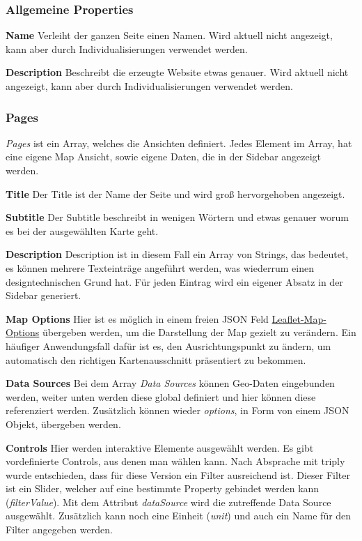 \subsubsection{Allgemeine Properties}
\textbf{Name}
Verleiht der ganzen Seite einen Namen.
Wird aktuell nicht angezeigt, kann aber durch Individualisierungen verwendet werden.

\textbf{Description}
Beschreibt die erzeugte Website etwas genauer.
Wird aktuell nicht angezeigt, kann aber durch Individualisierungen verwendet werden.

\subsubsection{Pages}
\emph{Pages} ist ein Array, welches die Ansichten definiert.
Jedes Element im Array, hat eine eigene Map Ansicht, sowie eigene Daten, die in der Sidebar angezeigt werden.

\textbf{Title}
Der Title ist der Name der Seite und wird groß hervorgehoben angezeigt.

\textbf{Subtitle}
Der Subtitle beschreibt in wenigen Wörtern und etwas genauer worum es bei der ausgewählten Karte geht.

\textbf{Description}
Description ist in diesem Fall ein Array von Strings, das bedeutet, es können mehrere Texteinträge angeführt werden,
was wiederrum einen designtechnischen Grund hat.
Für jeden Eintrag wird ein eigener Absatz in der Sidebar generiert.

\textbf{Map Options}
Hier ist es möglich in einem freien JSON Feld \href{https://leafletjs.com/SlavaUkraini/reference.html#map-option}{Leaflet-Map-Options}
übergeben werden, um die Darstellung der Map gezielt zu verändern.
Ein häufiger Anwendungsfall dafür ist es, den Ausrichtungspunkt zu ändern, um automatisch den richtigen Kartenausschnitt präsentiert zu bekommen.

\textbf{Data Sources}
Bei dem Array \emph{Data Sources} können Geo-Daten eingebunden werden, weiter unten werden diese global definiert und hier
können diese referenziert werden.
Zusätzlich können wieder \emph{options}, in Form von einem JSON Objekt, übergeben werden.

\textbf{Controls}
Hier werden interaktive Elemente ausgewählt werden.
Es gibt vordefinierte Controls, aus denen man wählen kann.
Nach Absprache mit triply wurde entschieden, dass für diese Version ein Filter ausreichend ist.
Dieser Filter ist ein Slider, welcher auf eine bestimmte Property gebindet werden kann (\emph{filterValue}).
Mit dem Attribut \emph{dataSource} wird die zutreffende Data Source ausgewählt.
Zusätzlich kann noch eine Einheit (\emph{unit}) und auch ein Name für den Filter angegeben werden.

